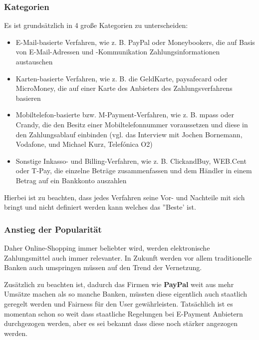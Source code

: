 \subsubsection{Kategorien}
Es ist grundsätzlich in 4 große Kategorien zu unterscheiden:

\begin{itemize}
	\item E-Mail-basierte Verfahren, wie z. B. PayPal oder Moneybookers, die auf Basis von E-Mail-Adressen und -Kommunikation Zahlungsinformationen austauschen
	\item Karten-basierte Verfahren, wie z. B. die GeldKarte, paysafecard oder MicroMoney, die auf einer Karte des Anbieters des Zahlungsverfahrens basieren
	\item Mobiltelefon-basierte bzw. M-Payment-Verfahren, wie z. B. mpass oder Crandy, die den Besitz einer Mobiltelefonnummer voraussetzen und diese in den Zahlungsablauf einbinden (vgl. das Interview mit Jochen Bornemann, Vodafone, und Michael Kurz, Telefónica O2)
	\item Sonstige Inkasso- und Billing-Verfahren, wie z. B. ClickandBuy, WEB.Cent oder T-Pay, die einzelne Beträge zusammenfassen und dem Händler in einem Betrag auf ein Bankkonto auszahlen
\end{itemize}

Hierbei ist zu beachten, dass jedes Verfahren seine Vor- und Nachteile mit sich bringt und nicht definiert werden kann welches das ''Beste' ist. 

\subsubsection{Anstieg der Popularität}
Daher Online-Shopping immer beliebter wird, werden elektronische Zahlungsmittel auch immer relevanter. In Zukunft werden vor allem traditionelle Banken auch umspringen müssen auf den Trend der Vernetzung.

Zusätzlich zu beachten ist, dadurch das Firmen wie \textbf{PayPal} weit aus mehr Umsätze machen als so manche Banken, müssten diese eigentlich auch staatlich geregelt werden und Fairness für den User gewährleisten. Tatsächlich ist es momentan schon so weit dass staatliche Regelungen bei E-Payment Anbietern durchgezogen werden, aber es sei bekannt dass diese noch stärker angezogen werden.

 
